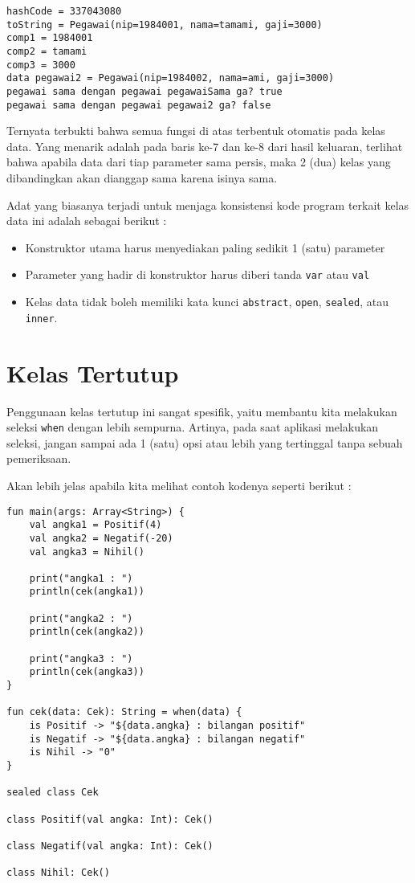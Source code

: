 \begin{lstlisting}
hashCode = 337043080
toString = Pegawai(nip=1984001, nama=tamami, gaji=3000)
comp1 = 1984001
comp2 = tamami
comp3 = 3000
data pegawai2 = Pegawai(nip=1984002, nama=ami, gaji=3000)
pegawai sama dengan pegawai pegawaiSama ga? true
pegawai sama dengan pegawai pegawai2 ga? false
\end{lstlisting}

Ternyata terbukti bahwa semua fungsi di atas terbentuk otomatis pada kelas data. Yang menarik adalah pada baris ke-7 dan ke-8 dari hasil keluaran, terlihat bahwa apabila data dari tiap parameter sama persis, maka 2 (dua) kelas yang dibandingkan akan dianggap sama karena isinya sama.

Adat yang biasanya terjadi untuk menjaga konsistensi kode program terkait kelas data ini adalah sebagai berikut : 

\begin{itemize}
	\item Konstruktor utama harus menyediakan paling sedikit 1 (satu) parameter
	\item Parameter yang hadir di konstruktor harus diberi tanda \texttt{var} atau \texttt{val}
	\item Kelas data tidak boleh memiliki kata kunci \texttt{abstract}, \texttt{open}, \texttt{sealed}, atau \texttt{inner}.
\end{itemize}

\section{Kelas Tertutup}

Penggunaan kelas tertutup ini sangat spesifik, yaitu membantu kita melakukan seleksi \texttt{when} dengan lebih sempurna. Artinya, pada saat aplikasi melakukan seleksi, jangan sampai ada 1 (satu) opsi atau lebih yang tertinggal tanpa sebuah pemeriksaan.

Akan lebih jelas apabila kita melihat contoh kodenya seperti berikut :

\begin{lstlisting}
fun main(args: Array<String>) {
	val angka1 = Positif(4)
	val angka2 = Negatif(-20)
	val angka3 = Nihil()
	
	print("angka1 : ")
	println(cek(angka1))
	
	print("angka2 : ")
	println(cek(angka2))
	
	print("angka3 : ")
	println(cek(angka3))
}

fun cek(data: Cek): String = when(data) {
	is Positif -> "${data.angka} : bilangan positif"
	is Negatif -> "${data.angka} : bilangan negatif"
	is Nihil -> "0"
}

sealed class Cek

class Positif(val angka: Int): Cek()

class Negatif(val angka: Int): Cek()

class Nihil: Cek()
\end{lstlisting}

